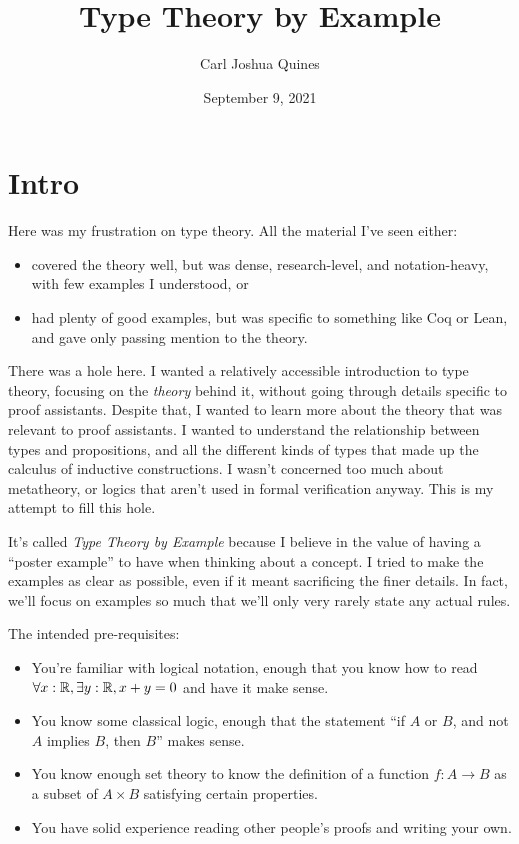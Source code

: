 \documentclass[11pt,paper=letter]{scrartcl}
\begin{document}
\title{Type Theory by Example}
\author{Carl Joshua Quines}
\date{September 9, 2021}

\maketitle

\tableofcontents

\clearpage

\section{Intro}

Here was my frustration on type theory. All the material I've seen either:
\begin{itemize}
\item covered the theory well, but was dense, research-level, and notation-heavy, with few examples I understood, or
\item had plenty of good examples, but was specific to something like Coq or Lean, and gave only passing mention to the theory.
\end{itemize}
There was a hole here. I wanted a relatively accessible introduction to type theory, focusing on the \emph{theory} behind it, without going through details specific to proof assistants. Despite that, I wanted to learn more about the theory that was relevant to proof assistants. I wanted to understand the relationship between types and propositions, and all the different kinds of types that made up the calculus of inductive constructions. I wasn't concerned too much about metatheory, or logics that aren't used in formal verification anyway. This is my attempt to fill this hole.

It's called \emph{Type Theory by Example} because I believe in the value of having a ``poster example'' to have when thinking about a concept. I tried to make the examples as clear as possible, even if it meant sacrificing the finer details. In fact, we'll focus on examples so much that we'll only very rarely state any actual rules.

The intended pre-requisites:

\begin{itemize}
\item You're familiar with logical notation, enough that you know how to read $\forall x: \mathbb R, \exists y: \mathbb R, x + y = 0$ and have it make sense.

\item You know some classical logic, enough that the statement ``if $A$ or $B$, and not $A$ implies $B$, then $B$'' makes sense.

\item You know enough set theory to know the definition of a function $f : A \to B$ as a subset of $A \times B$ satisfying certain properties.

\item You have solid experience reading other people's proofs and writing your own.
\end{itemize}
\end{document}
